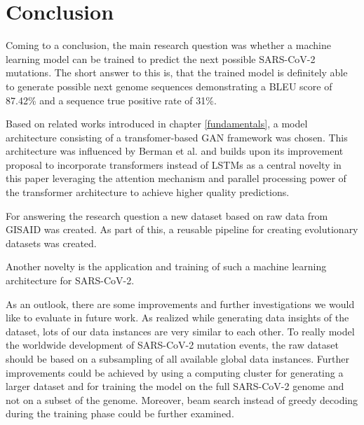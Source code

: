 \section{Conclusion} \label{conclusion}

Coming to a conclusion, the main research question was whether a machine learning model can be trained to predict the next possible \ac{SARS-CoV-2} mutations. The short answer to this is, that the trained model is definitely able to generate possible next genome sequences demonstrating a \ac{BLEU} score of 87.42\% and a sequence true positive rate of 31\%.

Based on related works introduced in chapter \ref{fundamentals}, a model architecture consisting of a transfomer-based \ac{GAN} framework was chosen. This architecture was influenced by Berman et al. \cite{Berman2020} and builds upon its improvement proposal to incorporate transformers instead of \acp{LSTM} as a central novelty in this paper leveraging the attention mechanism and parallel processing power of the transformer architecture to achieve higher quality predictions. 

For answering the research question a new dataset based on raw data from \ac{GISAID} was created. As part of this, a reusable pipeline for creating evolutionary datasets was created.

Another novelty is the application and training of such a machine learning architecture for \ac{SARS-CoV-2}.


\vspace{0.5cm}

As an outlook, there are some improvements and further investigations we would like to evaluate in future work. As realized while generating data insights of the dataset, lots of our data instances are very similar to each other. To really model the worldwide development of \ac{SARS-CoV-2} mutation events, the raw dataset should be based on a subsampling of all available global data instances. Further improvements could be achieved by using a computing cluster for generating a larger dataset and for training the model on the full \ac{SARS-CoV-2} genome and not on a subset of the genome. Moreover, beam search instead of greedy decoding during the training phase could be further examined.
